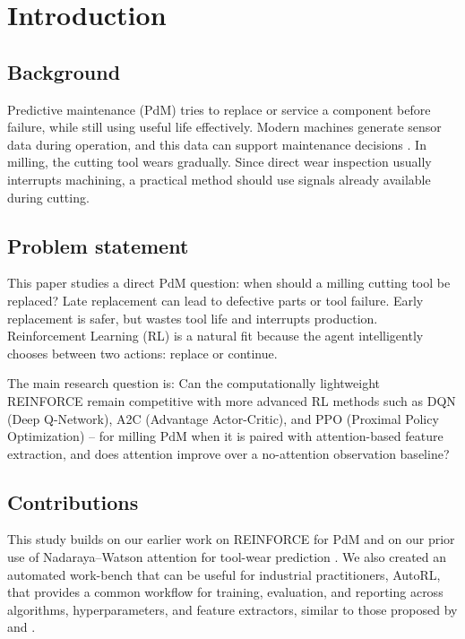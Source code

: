 \documentclass[sn-basic]{sn-jnl}%
\begin{document}

\maketitle

\section{Introduction}
\subsection{Background}
Predictive maintenance (PdM) tries to replace or service a component before failure, while still using useful life effectively. Modern machines generate sensor data during operation, and this data can support maintenance decisions \cite{Zonta2020, Compare2020}. In milling, the cutting tool wears gradually. Since direct wear inspection usually interrupts machining, a practical method should use signals already available during cutting.

\subsection{Problem statement}
This paper studies a direct PdM question: when should a milling cutting tool be replaced? Late replacement can lead to defective parts or tool failure. Early replacement is safer, but wastes tool life and interrupts production. Reinforcement Learning (RL) is a natural fit because the agent intelligently chooses between two actions: replace or continue.

The main research question is: Can the computationally lightweight \textsc{REINFORCE} remain competitive with more advanced RL methods such as \textsc{DQN} (Deep Q-Network), \textsc{A2C} (Advantage Actor-Critic), and \textsc{PPO} (Proximal Policy Optimization) -- for milling PdM when it is paired with attention-based feature extraction, and does attention improve over a no-attention observation baseline?

\subsection{Contributions}

This study builds on our earlier work on \textsc{REINFORCE} for PdM \cite{Siraskar2025} and on our prior use of Nadaraya--Watson attention for tool-wear prediction \cite{Siraskar2024}. We also created an automated work-bench that can be useful for industrial practitioners, AutoRL, that provides a common workflow for training, evaluation, and reporting across algorithms, hyperparameters, and feature extractors, similar to those proposed by \cite{Faust2019} and \cite{Mussi2022}.
\end{document}
